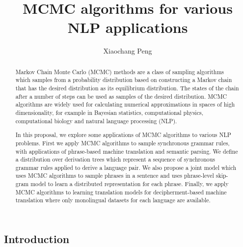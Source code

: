 \documentclass[12pt,leqno]{report}
\begin{document}
\begin{CJK}{UTF8}{cyberbit}

\title{MCMC algorithms for various NLP applications}
\author{Xiaochang Peng}


\maketitle

\thispagestyle{empty}

\begin{abstract}
Markov Chain Monte Carlo (MCMC) methods are a class of sampling algorithms which samples from a probability distribution based on constructing a Markov chain that has the desired distribution as its equilibrium distribution. The states of the chain after a number of steps can be used as samples of the desired distribution. 
MCMC algorithms are widely used for calculating numerical approximations in spaces of high dimensionality, for example in Bayesian statistics, computational physics, computational biology and natural language processing (NLP).


In this proposal, we explore some applications of MCMC algorithms to various NLP problems. First we apply MCMC algorithms to sample synchronous grammar rules, with applications of phrase-based machine translation and semantic parsing. We define a distribution over derivation trees which represent a sequence of synchronous grammar rules applied to derive a language pair. We also propose a joint model which uses MCMC algorithms to sample phrases in a sentence and uses phrase-level
skip-gram model to learn a distributed representation for each phrase. Finally, we apply MCMC algorithms to learning translation models for decipherment-based machine translation where only monolingual datasets for each language are available.
\end{abstract}

\tableofcontents

\chapter{Introduction}

\break


\end{CJK}
\end{document}
